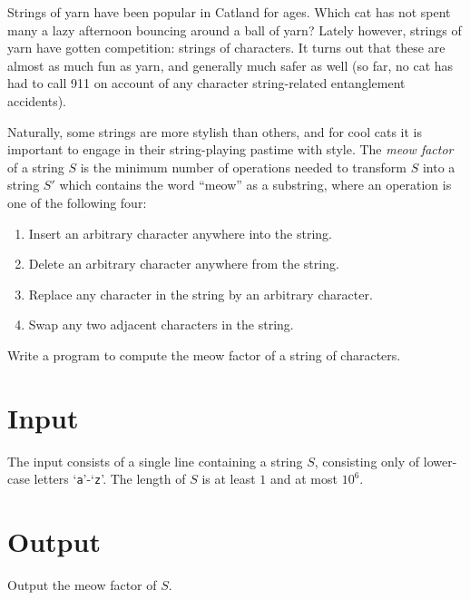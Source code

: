 
%
\noindent
Strings of yarn have been popular in Catland for ages.  Which cat has
not spent many a lazy afternoon bouncing around a ball of yarn?
Lately however, strings of yarn have gotten competition: strings of
characters.  It turns out that these are almost as much fun as yarn,
and generally much safer as well (so far, no cat has had to call 911
on account of any character string-related entanglement accidents).

Naturally, some strings are more stylish than others, and for cool
cats it is important to engage in their string-playing pastime with
style.  The \emph{meow factor} of a string $S$ is the minimum number
of operations needed to transform $S$ into a string $S'$ which
contains the word ``meow'' as a substring, where an operation is one
of the following four:
\begin{enumerate}
\item Insert an arbitrary character anywhere into the string.
\item Delete an arbitrary character anywhere from the string.
\item Replace any character in the string by an arbitrary character.
\item Swap any two adjacent characters in the string.
\end{enumerate}
Write a program to compute the meow factor of a string of characters.

\section*{Input}

The input consists of a single line containing a string $S$,
consisting only of lower-case letters `\texttt{a}'-`\texttt{z}'.  The
length of $S$ is at least $1$ and at most $10^6$.

\section*{Output}

Output the meow factor of $S$.

